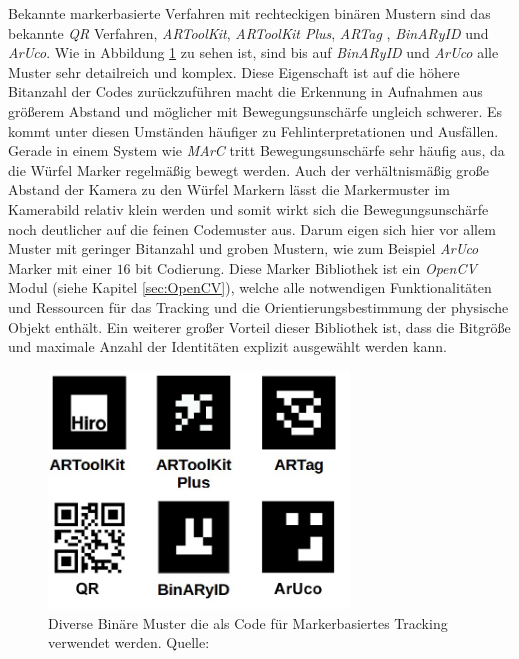 Bekannte markerbasierte Verfahren mit rechteckigen binären Mustern sind das bekannte \textit{QR} Verfahren, \textit{ARToolKit}\cite{article:MarkerARTOOL}, \textit{ARToolKit Plus}\cite{article:MarkerARTOOL2}, \textit{ARTag} \cite{article:MarkerARTag}, \textit{BinARyID}\cite{article:MarkerBinAR} und \textit{ArUco}\cite{article:Aruco2014}. Wie in Abbildung \ref{fig:BinMarker} zu sehen ist, sind bis auf \textit{BinARyID} und \textit{ArUco} alle Muster sehr detailreich und komplex. Diese Eigenschaft ist auf die höhere Bitanzahl der Codes zurückzuführen macht die Erkennung in Aufnahmen aus größerem Abstand und möglicher mit Bewegungsunschärfe ungleich schwerer. Es kommt unter diesen Umständen häufiger zu Fehlinterpretationen und Ausfällen. Gerade in einem System wie \textit{MArC} tritt Bewegungsunschärfe sehr häufig aus, da die Würfel Marker regelmäßig bewegt werden. Auch der verhältnismäßig große Abstand der Kamera zu den Würfel Markern lässt die Markermuster im Kamerabild relativ klein werden und somit wirkt sich die Bewegungsunschärfe noch deutlicher auf die feinen Codemuster aus. Darum eigen sich hier vor allem Muster mit geringer Bitanzahl und groben Mustern, wie zum Beispiel \textit{ArUco} Marker mit einer $16$ bit Codierung. Diese Marker Bibliothek ist ein \textit{OpenCV} Modul (siehe Kapitel \ref{sec:OpenCV}), welche alle notwendigen Funktionalitäten und Ressourcen für das Tracking und die Orientierungsbestimmung der physische Objekt enthält. Ein weiterer großer Vorteil dieser Bibliothek ist, dass die Bitgröße und maximale Anzahl der Identitäten explizit ausgewählt werden kann.


\begin{figure}[H] 
	\center 
	\includegraphics[width=8cm]{Bilder/BinMuster.jpg}			
	\caption{Diverse Binäre Muster die als Code für Markerbasiertes Tracking verwendet werden. Quelle: \cite{article:Aruco2014}}
	\label{fig:BinMarker}
\end{figure}

\newpage